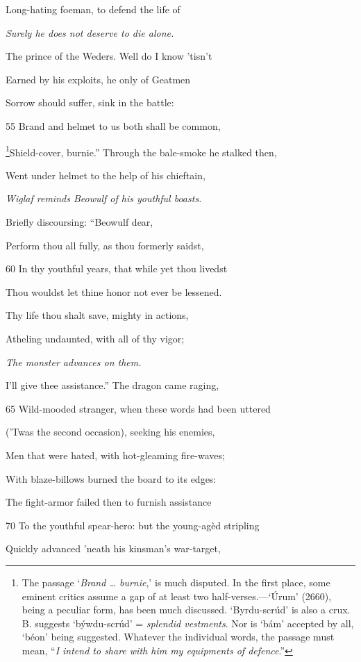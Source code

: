 Long-hating foeman, to defend the life of

\emph{Surely he does
not deserve to die
alone.}

The prince of the Weders. Well do I know ’tisn’t

Earned by his exploits, he only of Geatmen

Sorrow should suffer, sink in the battle:

55
Brand and helmet to us both shall be common,

\footnote{The passage ‘\emph{Brand … burnie},’ is much disputed. In the first place,
some eminent critics assume a gap of at least two half-verses.—‘Úrum’ (2660),
being a peculiar form, has been much discussed. ‘Byrdu-scrúd’ is also a crux.
B. suggests ‘býwdu-scrúd’ = \emph{splendid vestments}. Nor is ‘bám’ accepted by all,
‘béon’ being suggested. Whatever the individual words, the passage must
mean, “\emph{I intend to share with him my equipments of defence}.”}Shield-cover, burnie.” Through the bale-smoke he stalked then,

Went under helmet to the help of his chieftain,

\emph{Wiglaf reminds
Beowulf of his
youthful boasts.}

Briefly discoursing: “Beowulf dear,

Perform thou all fully, as thou formerly saidst,

60
In thy youthful years, that while yet thou livedst

Thou wouldst let thine honor not ever be lessened.

Thy life thou shalt save, mighty in actions,

Atheling undaunted, with all of thy vigor;

\emph{The monster advances
on them.}

I’ll give thee assistance.” The dragon came raging,

65
Wild-mooded stranger, when these words had been uttered

(’Twas the second occasion), seeking his enemies,

Men that were hated, with hot-gleaming fire-waves;

With blaze-billows burned the board to its edges:

The fight-armor failed then to furnish assistance

70
To the youthful spear-hero: but the young-agèd stripling

Quickly advanced ’neath his kinsman’s war-target,

